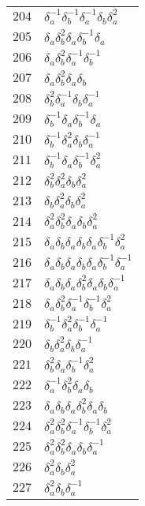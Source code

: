 \documentclass{article}
\begin{document}
\begin{center}
\begin{tabular}{ll}
$204$ & $\delta_a^{-1}\delta_b^{-1}\delta_a^{-1}\delta_b^{}\delta_a^{2}$ \\
$205$ & $\delta_a^{}\delta_b^{2}\delta_a^{}\delta_b^{-1}\delta_a^{}$ \\
$206$ & $\delta_a^{}\delta_b^{2}\delta_a^{-1}\delta_b^{-1}$ \\
$207$ & $\delta_a^{}\delta_b^{2}\delta_a^{}\delta_b^{}$ \\
$208$ & $\delta_b^{2}\delta_a^{-1}\delta_b^{}\delta_a^{-1}$ \\
$209$ & $\delta_b^{-1}\delta_a^{}\delta_b^{-1}\delta_a^{}$ \\
$210$ & $\delta_b^{-1}\delta_a^{2}\delta_b^{}\delta_a^{-1}$ \\
$211$ & $\delta_b^{-1}\delta_a^{}\delta_b^{-1}\delta_a^{2}$ \\
$212$ & $\delta_b^{2}\delta_a^{2}\delta_b^{}\delta_a^{2}$ \\
$213$ & $\delta_b^{}\delta_a^{2}\delta_b^{}\delta_a^{2}$ \\
$214$ & $\delta_a^{2}\delta_b^{2}\delta_a^{}\delta_b^{}\delta_a^{2}$ \\
$215$ & $\delta_a^{}\delta_b^{}\delta_a^{}\delta_b^{}\delta_a^{}\delta_b^{-1}\delta_a^{2}$ \\
$216$ & $\delta_a^{}\delta_b^{}\delta_a^{}\delta_b^{}\delta_a^{}\delta_b^{-1}\delta_a^{-1}$ \\
$217$ & $\delta_a^{}\delta_b^{}\delta_a^{}\delta_b^{2}\delta_a^{}\delta_b^{}\delta_a^{-1}$ \\
$218$ & $\delta_a^{}\delta_b^{2}\delta_a^{-1}\delta_b^{-1}\delta_a^{2}$ \\
$219$ & $\delta_b^{-1}\delta_a^{2}\delta_b^{-1}\delta_a^{-1}$ \\
$220$ & $\delta_b^{}\delta_a^{2}\delta_b^{}\delta_a^{-1}$ \\
$221$ & $\delta_b^{2}\delta_a^{}\delta_b^{-1}\delta_a^{2}$ \\
$222$ & $\delta_a^{-1}\delta_b^{2}\delta_a^{}\delta_b^{}$ \\
$223$ & $\delta_a^{}\delta_b^{}\delta_a^{}\delta_b^{2}\delta_a^{}\delta_b^{}$ \\
$224$ & $\delta_a^{2}\delta_b^{2}\delta_a^{-1}\delta_b^{-1}\delta_a^{2}$ \\
$225$ & $\delta_a^{2}\delta_b^{2}\delta_a^{}\delta_b^{}\delta_a^{-1}$ \\
$226$ & $\delta_a^{2}\delta_b^{}\delta_a^{2}$ \\
$227$ & $\delta_a^{2}\delta_b^{}\delta_a^{-1}$ \\

\end{tabular}
\end{center}
\end{document}
